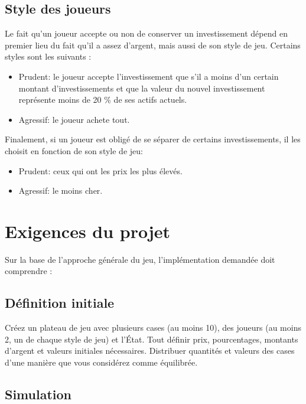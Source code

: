 \documentclass[12pt]{article}
\begin{document}
    \subsection{Style des joueurs}

    Le fait qu'un joueur accepte ou non de conserver un investissement dépend en premier lieu 
    du fait qu'il a assez d'argent, mais aussi de son style de jeu. 
    Certains styles sont les suivants :
        \begin{itemize}
           \item Prudent: le joueur accepte l'investissement que s'il a moins d'un certain montant 
           d'investissements et que la valeur du nouvel investissement représente moins de 20 \% de ses
           actifs actuels.
           \item  Agressif: le joueur achete tout.
        \end{itemize}

    Finalement, si un joueur est obligé de se séparer de certains investissements, 
        il les choisit en fonction de son style de jeu:
        \begin{itemize}
            \item Prudent: ceux qui ont les prix les plus élevés.
            \item Agressif: le moins cher.
        \end{itemize}


        
\section{Exigences du projet}
Sur la base de l'approche générale du jeu, 
l'implémentation demandée doit comprendre :

\subsection{Définition initiale}
Créez un plateau de jeu avec plusieurs cases (au moins 10), des joueurs (au moins 2, un de
chaque style de jeu) et l'État. Tout définir prix, pourcentages, montants d’argent et
valeurs initiales nécessaires. 
Distribuer quantités et valeurs des cases d'une manière que vous considérez comme équilibrée.

\subsection{Simulation}
\end{document}
